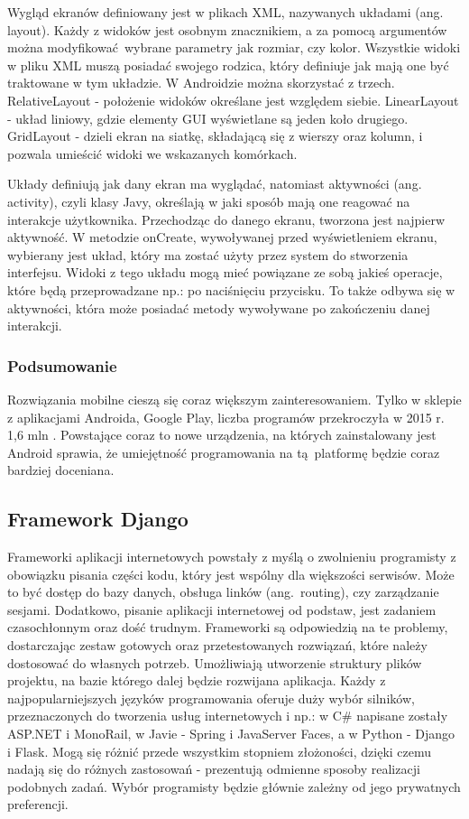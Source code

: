 Wygląd ekranów definiowany jest w plikach XML, nazywanych układami (ang. layout). Każdy z widoków jest osobnym znacznikiem, a za pomocą argumentów można modyfikować wybrane parametry jak rozmiar, czy kolor. Wszystkie widoki w pliku XML muszą posiadać swojego rodzica, który definiuje jak mają one być traktowane w tym układzie. W Androidzie można skorzystać z trzech. RelativeLayout - położenie widoków określane jest względem siebie. LinearLayout - układ liniowy, gdzie elementy GUI wyświetlane są jeden koło drugiego. GridLayout - dzieli ekran na siatkę, składającą się z wierszy oraz kolumn, i pozwala umieścić widoki we wskazanych komórkach.

Układy definiują jak dany ekran ma wyglądać, natomiast aktywności (ang. activity), czyli klasy Javy, określają w jaki sposób mają one reagować na interakcje użytkownika. Przechodząc do danego ekranu, tworzona jest najpierw aktywność. W metodzie onCreate, wywoływanej przed wyświetleniem ekranu, wybierany jest układ, który ma zostać użyty przez system do stworzenia interfejsu. Widoki z tego układu mogą mieć powiązane ze sobą jakieś operacje, które będą przeprowadzane np.: po naciśnięciu przycisku. To także odbywa się w aktywności, która może posiadać metody wywoływane po zakończeniu danej interakcji.

\subsubsection*{Podsumowanie}
Rozwiązania mobilne cieszą się coraz większym zainteresowaniem. Tylko w sklepie z aplikacjami Androida, Google Play, liczba programów przekroczyła w 2015 r. 1,6 mln \cite{biblia_ebiznesu_2}. Powstające coraz to nowe urządzenia, na których zainstalowany jest Android sprawia, że umiejętność programowania na tą platformę będzie coraz bardziej doceniana.


\subsection{Framework Django}
Frameworki aplikacji internetowych powstały z myślą o zwolnieniu programisty z obowiązku pisania części kodu, który jest wspólny dla większości serwisów. Może to być dostęp do bazy danych, obsługa linków (ang.~routing), czy zarządzanie sesjami. Dodatkowo, pisanie aplikacji internetowej od podstaw, jest zadaniem czasochłonnym oraz dość trudnym. Frameworki są odpowiedzią na te problemy, dostarczając zestaw gotowych oraz przetestowanych rozwiązań, które należy dostosować do własnych potrzeb. Umożliwiają utworzenie struktury plików projektu, na bazie którego dalej będzie rozwijana aplikacja. Każdy z najpopularniejszych języków programowania oferuje duży wybór silników, przeznaczonych do tworzenia usług internetowych i np.: w C\# napisane zostały ASP.NET i MonoRail, w Javie - Spring i JavaServer Faces, a w Python - Django i Flask. Mogą się różnić przede wszystkim stopniem złożoności, dzięki czemu nadają się do różnych zastosowań - prezentują odmienne sposoby realizacji podobnych zadań. Wybór programisty będzie głównie zależny od jego prywatnych preferencji.

